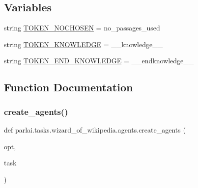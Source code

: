 \subsection*{Variables}
\begin{DoxyCompactItemize}
\item 
string \hyperlink{namespaceparlai_1_1tasks_1_1wizard__of__wikipedia_1_1agents_a77fb4cd4f27c9b47db8e4d7b3167701d}{T\+O\+K\+E\+N\+\_\+\+N\+O\+C\+H\+O\+S\+EN} = \textquotesingle{}no\+\_\+passages\+\_\+used\textquotesingle{}
\item 
string \hyperlink{namespaceparlai_1_1tasks_1_1wizard__of__wikipedia_1_1agents_a1bf3cbe02594ea63d40c785b653b8669}{T\+O\+K\+E\+N\+\_\+\+K\+N\+O\+W\+L\+E\+D\+GE} = \textquotesingle{}\+\_\+\+\_\+knowledge\+\_\+\+\_\+\textquotesingle{}
\item 
string \hyperlink{namespaceparlai_1_1tasks_1_1wizard__of__wikipedia_1_1agents_ab1fe58de604b38173f700e410d5df56e}{T\+O\+K\+E\+N\+\_\+\+E\+N\+D\+\_\+\+K\+N\+O\+W\+L\+E\+D\+GE} = \textquotesingle{}\+\_\+\+\_\+endknowledge\+\_\+\+\_\+\textquotesingle{}
\end{DoxyCompactItemize}


\subsection{Function Documentation}
\mbox{\label{namespaceparlai_1_1tasks_1_1wizard__of__wikipedia_1_1agents_a89bd55d60a50f2604b1eb59ab0e064bc}} 
\subsubsection{\texorpdfstring{create\+\_\+agents()}{create\_agents()}}
{\footnotesize\ttfamily def parlai.\+tasks.\+wizard\+\_\+of\+\_\+wikipedia.\+agents.\+create\+\_\+agents (\begin{DoxyParamCaption}\item[{}]{opt,  }\item[{}]{task }\end{DoxyParamCaption})}



